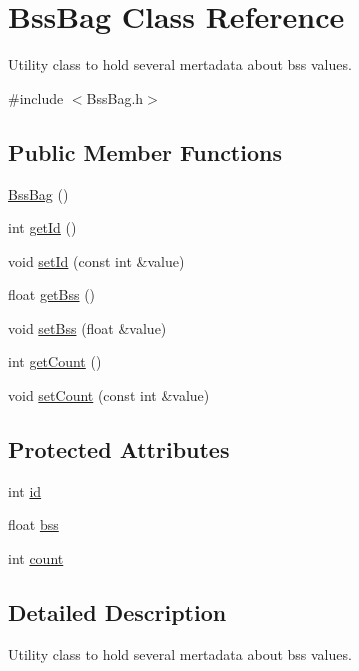 \hypertarget{class_bss_bag}{}\section{Bss\+Bag Class Reference}
\label{class_bss_bag}


Utility class to hold several mertadata about bss values.  




{\ttfamily \#include $<$Bss\+Bag.\+h$>$}

\subsection*{Public Member Functions}
\begin{DoxyCompactItemize}
\item 
\hyperlink{class_bss_bag_abb31cee62944f202a6756bd6fcd6c158}{Bss\+Bag} ()
\item 
int \hyperlink{class_bss_bag_a3a5526da6d1ee974b30dfd3fbd1614a5}{get\+Id} ()
\item 
void \hyperlink{class_bss_bag_a5dd08830be4efe94b32d53a66d87fb66}{set\+Id} (const int \&value)
\item 
float \hyperlink{class_bss_bag_ac0e679534b5a13c40fdfb762179a8ea7}{get\+Bss} ()
\item 
void \hyperlink{class_bss_bag_a4af9c2093b7db7000eb56e45a3e4b282}{set\+Bss} (float \&value)
\item 
int \hyperlink{class_bss_bag_a138d22f0c4e2ef662be9029939fc48a9}{get\+Count} ()
\item 
void \hyperlink{class_bss_bag_ad5faad808217f303c617078ddfa0c009}{set\+Count} (const int \&value)
\end{DoxyCompactItemize}
\subsection*{Protected Attributes}
\begin{DoxyCompactItemize}
\item 
int \hyperlink{class_bss_bag_ad4221d2f1212e092891726228fe7bf76}{id}
\item 
float \hyperlink{class_bss_bag_a8dee659da83dcfb77bebcb758d2e3522}{bss}
\item 
int \hyperlink{class_bss_bag_adabd6cf3912f3bff5a31c2c897867556}{count}
\end{DoxyCompactItemize}


\subsection{Detailed Description}
Utility class to hold several mertadata about bss values. 

